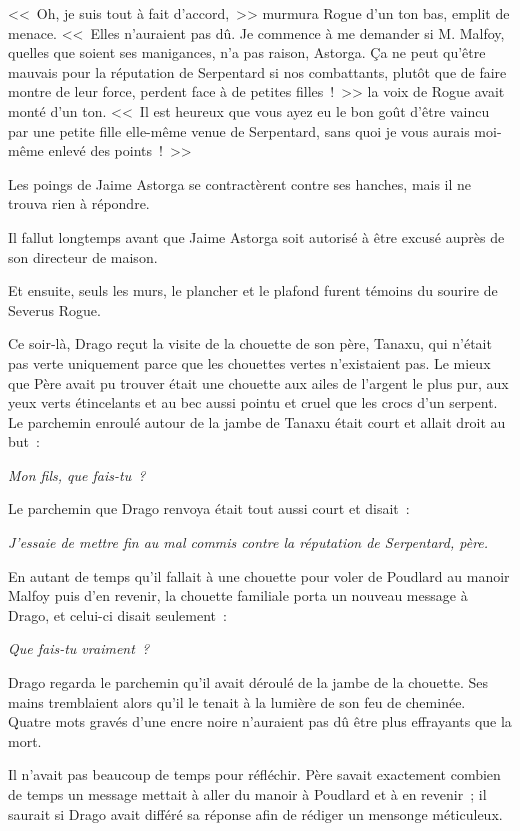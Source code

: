 <<~Oh, je suis tout à fait d'accord,~>> murmura Rogue d'un ton bas, emplit de menace. <<~Elles n'auraient pas dû. Je commence à me demander si M. Malfoy, quelles que soient ses manigances, n'a pas raison, Astorga. Ça ne peut qu'être mauvais pour la réputation de Serpentard si nos combattants, plutôt que de faire montre de leur force, perdent face à de petites filles~!~>> la voix de Rogue avait monté d'un ton. <<~Il est heureux que vous ayez eu le bon goût d'être vaincu par une petite fille elle-même venue de Serpentard, sans quoi je vous aurais moi-même enlevé des points~!~>>

Les poings de Jaime Astorga se contractèrent contre ses hanches, mais il ne trouva rien à répondre.

Il fallut longtemps avant que Jaime Astorga soit autorisé à être excusé auprès de son directeur de maison.

Et ensuite, seuls les murs, le plancher et le plafond furent témoins du sourire de Severus Rogue.

\later

Ce soir-là, Drago reçut la visite de la chouette de son père, Tanaxu, qui n'était pas verte uniquement parce que les chouettes vertes n'existaient pas. Le mieux que Père avait pu trouver était une chouette aux ailes de l'argent le plus pur, aux yeux verts étincelants et au bec aussi pointu et cruel que les crocs d'un serpent. Le parchemin enroulé autour de la jambe de Tanaxu était court et allait droit au but~:

\emph{Mon fils, que fais-tu~?}

Le parchemin que Drago renvoya était tout aussi court et disait~:

\emph{J'essaie de mettre fin au mal commis contre la réputation de Serpentard, père.}

En autant de temps qu'il fallait à une chouette pour voler de Poudlard au manoir Malfoy puis d'en revenir, la chouette familiale porta un nouveau message à Drago, et celui-ci disait seulement~:

\emph{Que fais-tu vraiment~?}

Drago regarda le parchemin qu'il avait déroulé de la jambe de la chouette. Ses mains tremblaient alors qu'il le tenait à la lumière de son feu de cheminée. Quatre mots gravés d'une encre noire n'auraient pas dû être plus effrayants que la mort.

Il n'avait pas beaucoup de temps pour réfléchir. Père savait exactement combien de temps un message mettait à aller du manoir à Poudlard et à en revenir~; il saurait si Drago avait différé sa réponse afin de rédiger un mensonge méticuleux.

